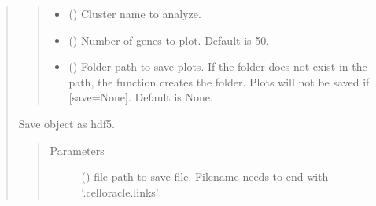 \documentclass[letterpaper,10pt,english]{sphinxmanual}
\begin{document}
\begin{quote}
\begin{fulllineitems}
\begin{fulllineitems}
\begin{quote}
\begin{description}
\begin{itemize}
\item {} 
 () \textendash{} Cluster name to analyze.

\item {} 
 () \textendash{} Number of genes to plot. Default is 50.

\item {} 
 () \textendash{} Folder path to save plots. If the folder does not exist in the path, the function creates the folder.
Plots will not be saved if {[}save=None{]}. Default is None.

\end{itemize}

\end{description}\end{quote}

\end{fulllineitems}


\begin{fulllineitems}
\label{\detokenize{modules/celloracle.network_analysis:celloracle.network_analysis.Links.to_hdf5}}
Save object as hdf5.
\begin{quote}\begin{description}
\item[{Parameters}] \leavevmode
{} () \textendash{} file path to save file. Filename needs to end with ‘.celloracle.links’

\end{description}\end{quote}

\end{fulllineitems}


\end{fulllineitems}



\end{quote}
\end{document}
